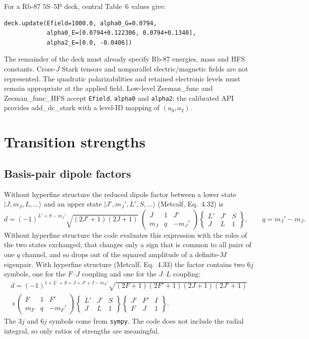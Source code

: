 \documentclass[11pt,a4paper]{article}
\newcommand{\threej}[6]{\begin{pmatrix} #1 & #2 & #3\\ #4 & #5 & #6\end{pmatrix}}
\newcommand{\sixj}[6]{\begin{Bmatrix} #1 & #2 & #3\\ #4 & #5 & #6\end{Bmatrix}}
\newcommand{\code}[1]{\texttt{#1}}
\newcommand{\routine}[1]{\textsf{#1}}
\numberwithin{equation}{section}
\begin{document}
For a Rb-87 5S--5P deck, central Table~6 values give:
\begin{verbatim}
deck.update(Efield=1000.0, alpha0_G=0.0794,
            alpha0_E=[0.0794+0.122306, 0.0794+0.1340],
            alpha2_E=[0.0, -0.0406])
\end{verbatim}
The remainder of the deck must already specify Rb-87 energies, mass and HFS constants. Cross-$J$ Stark tensors and nonparallel electric/magnetic fields are not represented. The quadratic polarizabilities and retained electronic levels must remain appropriate at the applied field. Low-level \routine{Zeeman\_func} and \routine{Zeeman\_func\_HFS} accept \code{Efield}, \code{alpha0} and \code{alpha2}; the calibrated API provides \routine{add\_dc\_stark} with a level-ID mapping of $(a_0,a_2)$.

\section{Transition strengths}\label{sec:transitions}

\subsection{Basis-pair dipole factors}
Without hyperfine structure the reduced dipole factor between a lower state $\vert J,m_J,L,\dots\rangle$ and an upper state $\vert J',m_J',L',S,\dots\rangle$ (Metcalf, Eq.~4.32) is
\begin{equation}
d = (-1)^{L'+S-m_J'}\sqrt{(2J'+1)(2J+1)}\;\threej{J}{1}{J'}{m_J}{q}{-m_J'}\sixj{L'}{J'}{S}{J}{L}{1},\qquad q=m_J'-m_J .
\end{equation}
Without hyperfine structure the code evaluates this expression with the roles of the two states exchanged; that changes only a sign that is common to all pairs of one $q$ channel, and so drops out of the squared amplitude of a definite-$M$ eigenpair. With hyperfine structure (Metcalf, Eq.~4.33) the factor contains two $6j$ symbols, one for the $F$--$J$ coupling and one for the $J$--$L$ coupling:
\begin{multline}
d = (-1)^{1+L'+S+J+J'+I-m_F'}\sqrt{(2F+1)(2F'+1)(2J+1)(2J'+1)}\\
\times\threej{F}{1}{F'}{m_F}{q}{-m_F'}\sixj{L'}{J'}{S}{J}{L}{1}\sixj{J'}{F'}{I}{F}{J}{1}.
\end{multline}
The $3j$ and $6j$ symbols come from \code{sympy}. The code does not include the radial integral, so only ratios of strengths are meaningful.
\end{document}
